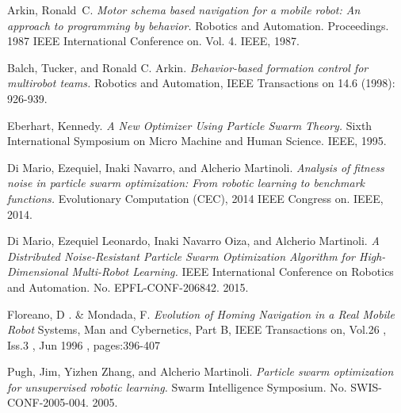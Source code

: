 \documentclass[journal]{IEEEtran}
\begin{document}

%
%
%
\begin{thebibliography}{1}

Arkin, Ronald~C. \emph{Motor schema based navigation for a mobile
  robot: An approach to programming by behavior.} 
Robotics and Automation. Proceedings. 1987 IEEE International Conference on. Vol. 4. IEEE, 1987.

Balch, Tucker, and Ronald C. Arkin. \emph{Behavior-based formation
  control for multirobot teams.}
 Robotics and Automation, IEEE Transactions on 14.6 (1998): 926-939.
 
Eberhart, Kennedy. \emph{A New Optimizer Using Particle Swarm Theory.}
 Sixth International Symposium on Micro Machine and Human Science. IEEE, 1995.

Di Mario, Ezequiel, Inaki Navarro, and Alcherio
Martinoli. \emph{Analysis of fitness noise in particle swarm
  optimization: From robotic learning to benchmark functions.}
 Evolutionary Computation (CEC), 2014 IEEE Congress on. IEEE, 2014.

Di Mario, Ezequiel Leonardo, Inaki Navarro Oiza, and Alcherio
Martinoli. 
\emph{A Distributed Noise-Resistant Particle Swarm Optimization
  Algorithm for High-Dimensional Multi-Robot Learning.}
 IEEE International Conference on Robotics and Automation. No. EPFL-CONF-206842. 2015.

Floreano, D . \& Mondada, F. \emph{Evolution of Homing Navigation in a Real
Mobile Robot} Systems, Man and Cybernetics, Part B, IEEE Transactions
on, Vol.26 , Iss.3 , Jun 1996 , pages:396-407

Pugh, Jim, Yizhen Zhang, and Alcherio Martinoli. \emph{Particle swarm
  optimization for unsupervised robotic learning.}
 Swarm Intelligence Symposium. No. SWIS-CONF-2005-004. 2005.

\end{thebibliography}
\end{document}
